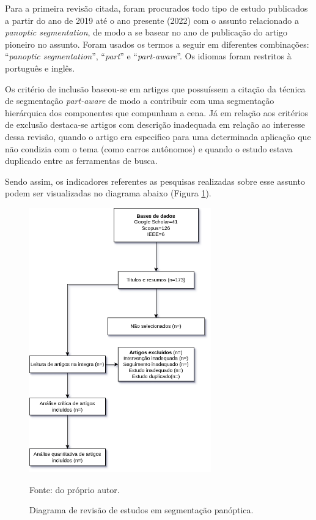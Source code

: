 Para a primeira revisão citada, foram procurados todo tipo de estudo publicados a partir do ano de 2019 até o ano presente (2022) com o assunto relacionado a \textit{panoptic segmentation}, de modo a se basear no ano de publicação do artigo pioneiro \cite{Kirillov2019a} no assunto. Foram usados os termos a seguir em diferentes combinações: ``\textit{panoptic segmentation}'', ``\textit{part}'' e ``\textit{part-aware}''. Os idiomas foram restritos à português e inglês.

Os critério de inclusão baseou-se em artigos que possuíssem a citação da técnica de segmentação \textit{part-aware} de modo a contribuir com uma segmentação hierárquica dos componentes que compunham a cena. Já em relação aos critérios de exclusão destaca-se artigos com descrição inadequada em relação ao interesse dessa revisão, quando o artigo era especifico para uma determinada aplicação que não condizia com o tema (como carros autônomos) e quando o estudo estava duplicado entre as ferramentas de busca.

Sendo assim, os indicadores referentes as pesquisas realizadas sobre esse assunto podem ser visualizadas no diagrama abaixo (Figura \ref{proposal:revision:fig:1}).

\begin{figure}[H]
    \centering
    \caption{Diagrama de revisão de estudos em segmentação panóptica.}
    \includegraphics[height=4.5in]{recursos/imagens/proposal/revisao1.png}
    \label{proposal:revision:fig:1}

    \vspace*{1 cm}
    Fonte: do próprio autor.
\end{figure}

